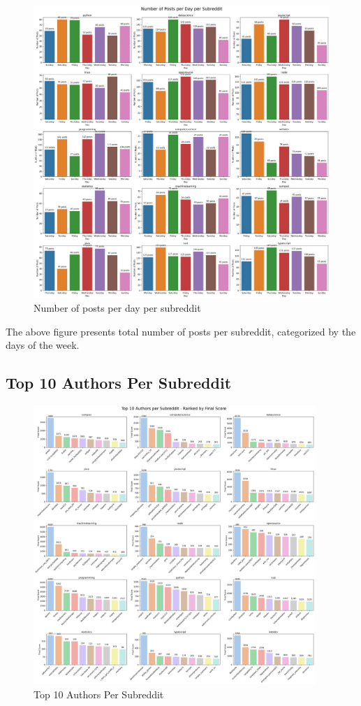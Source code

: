 \documentclass[12pt, letterpage]{article}
\begin{document}
\begin{figure}[H]
    \centering
    \includegraphics[width=1\textwidth]{num_posts_per_day_per_subreddit_bar.png}
    \caption{Number of posts per day per subreddit}
    \label{fig:posts_per_day}
\end{figure}

The above figure presents total number of posts per subreddit, categorized by the days of the week.

\subsection*{Top 10 Authors Per Subreddit}

\begin{figure}[H]
    \centering
    \includegraphics[width=0.95\textwidth]{author_rank.png}
    \caption{Top 10 Authors Per Subreddit}
    \label{fig:top_authors_per_subreddit}
\end{figure}
\end{document}
